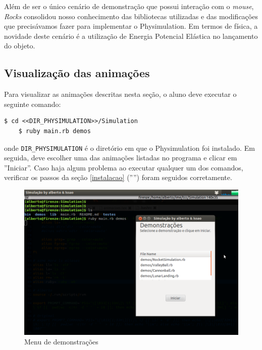 Além de ser o único cenário de demonstração que possui interação com o \textit{mouse}, \textit{Rocks} consolidou nosso conhecimento das bibliotecas utilizadas e das modificações que precisávamos fazer para implementar o Physimulation. Em termos de física, a novidade deste cenário é a utilização de Energia Potencial Elástica no lançamento do objeto. 

\subsection{Visualização das animações}
Para visualizar as animações descritas nesta seção, o aluno deve executar o seguinte comando:

\begin{Verbatim}[fontsize=\footnotesize]
	$ cd <<DIR_PHYSIMULATION>>/Simulation
	$ ruby main.rb demos
\end{Verbatim}

onde {\tt\footnotesize DIR\_PHYSIMULATION} é o diretório em que o Physimulation foi instalado. Em seguida, deve escolher uma das animações listadas no programa e clicar em ''Iniciar''. Caso haja algum problema ao executar qualquer um dos comandos, verificar os passos da seção \ref{instalacao} ('''') foram seguidos corretamente.

\begin{figure}[H]
	\centering
	\includegraphics[scale=0.3]{images/demos-menu.png}
	\caption{Menu de demonstrações}
\end{figure}


